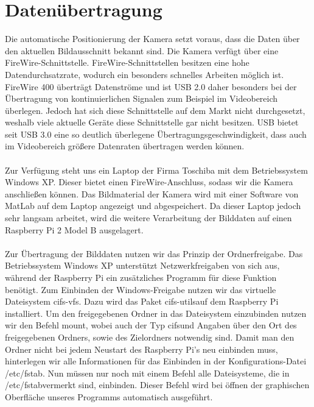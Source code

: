 \documentclass[a4paper]{report}
\begin{document}
\chapter{Datenübertragung}
Die automatische Positionierung der Kamera setzt voraus, dass die Daten über den aktuellen Bildausschnitt bekannt sind. Die Kamera verfügt über eine FireWire-Schnittstelle. FireWire-Schnittstellen besitzen eine hohe Datendurchsatzrate, wodurch ein besonders schnelles Arbeiten möglich ist. FireWire 400 überträgt Datenströme und ist USB 2.0 daher besonders bei der Übertragung von kontinuierlichen Signalen zum Beispiel im Videobereich überlegen. Jedoch hat sich diese Schnittstelle auf dem Markt nicht durchgesetzt, weshalb viele aktuelle Geräte diese Schnittstelle gar nicht besitzen. USB bietet seit USB 3.0 eine so deutlich überlegene Übertragungsgeschwindigkeit, dass auch im Videobereich größere Datenraten übertragen werden können. \\ \\
Zur Verfügung steht uns ein Laptop der Firma Toschiba mit dem Betriebssystem Windows XP. Dieser bietet einen FireWire-Anschluss, sodass wir die Kamera anschließen können. Das Bildmaterial der Kamera wird mit einer Software von MatLab auf dem Laptop angezeigt und abgespeichert. Da dieser Laptop jedoch sehr langsam arbeitet, wird die weitere Verarbeitung der Bilddaten auf einen Raspberry Pi 2 Model B ausgelagert. \\ \\
Zur Übertragung der Bilddaten nutzen wir das Prinzip der Ordnerfreigabe. Das Betriebssystem Windows XP unterstützt Netzwerkfreigaben von sich aus, während der Raspberry Pi ein zusätzliches Programm für diese Funktion benötigt. Zum Einbinden der Windows-Freigabe nutzen wir das virtuelle Dateisystem \glqq cifs-vfs\grqq. Dazu wird das Paket \glqq cifs-utils\grqq auf dem Raspberry Pi installiert. Um den freigegebenen Ordner in das Dateisystem einzubinden nutzen wir den Befehl \glqq mount\grqq, wobei auch der Typ \glqq cifs\grqq und Angaben über den Ort des freigegebenen Ordners, sowie des Zielordners notwendig sind. Damit man den Ordner nicht bei jedem Neustart des Raspberry Pi's neu einbinden muss, hinterlegen wir alle Informationen für das Einbinden in der Konfigurations-Datei \glqq /etc/fstab\grqq. Nun müssen nur noch mit einem Befehl alle Dateisysteme, die in \glqq /etc/fstab\grqq vermerkt sind, einbinden. Dieser Befehl wird bei öffnen der graphischen Oberfläche unseres Programms automatisch ausgeführt. \\ \\
\end{document}
